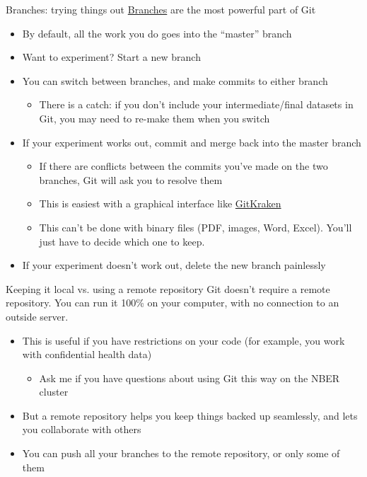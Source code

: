 \documentclass{beamer}
\begin{document}
\begin{frame}{Branches: trying things out}
\href{https://git-scm.com/book/en/v2/Git-Branching-Branches-in-a-Nutshell}{Branches} are the most powerful part of Git
\begin{itemize}
\item By default, all the work you do goes into the ``master'' branch
\item Want to experiment? Start a new branch
\item You can switch between branches, and make commits to either branch
\begin{itemize}
\item There is a catch: if you don't include your intermediate/final datasets in Git, you may need to re-make them when you switch
\end{itemize}
\item If your experiment works out, commit and merge back into the master branch
\begin{itemize}
\item If there are conflicts between the commits you've made on the two branches, Git will ask you to resolve them
\item This is easiest with a graphical interface like \href{https://support.gitkraken.com/working-with-repositories/branching-and-merging/}{GitKraken}
\item This can't be done with binary files (PDF, images, Word, Excel). You'll just have to decide which one to keep.
\end{itemize}
\item If your experiment doesn't work out, delete the new branch painlessly
\end{itemize}
\end{frame}

\begin{frame}{Keeping it local vs. using a remote repository}
Git doesn't require a remote repository. You can run it 100\% on your computer, with no connection to an outside server.
\begin{itemize}
\item This is useful if you have restrictions on your code (for example, you work with confidential health data)
\begin{itemize}
\item Ask me if you have questions about using Git this way on the NBER cluster
\end{itemize}
\item But a remote repository helps you keep things backed up seamlessly, and lets you collaborate with others
\item You can push all your branches to the remote repository, or only some of them
\end{itemize}

\end{frame}
\end{document}
